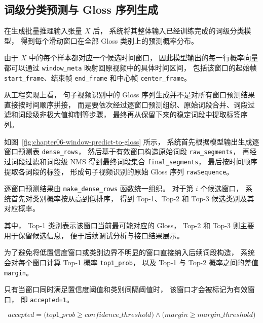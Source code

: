 
\subsection{词级分类预测与 Gloss 序列生成}

在生成批量推理输入张量 $X$ 后，
系统将其整体输入已经训练完成的词级分类模型，
得到每个滑动窗口在全部 Gloss 类别上的预测概率分布。

由于 $X$ 中的每个样本都对应一个候选时间窗口，
因此模型输出的每一行概率向量都可以通过 \texttt{window\_meta} 映射回原视频中的具体时间区间，
包括该窗口的起始帧 \texttt{start\_frame}、结束帧 \texttt{end\_frame} 和中心帧 \texttt{center\_frame}。

从工程实现上看，
句子视频识别中的 Gloss 序列生成并不是对所有窗口预测结果直接按时间顺序拼接，
而是要依次经过逐窗口预测组织、原始词段合并、词段过滤和词段级非极大值抑制等步骤，
最终再从保留下来的稳定词段中提取标签序列。


如图~\ref{fig:chapter06-window-predict-to-gloss} 所示，
系统首先根据模型输出生成逐窗口预测表 \texttt{dense\_rows}，
然后基于有效窗口构造原始词段 \texttt{raw\_segments}，
再经过词段过滤和词段级 NMS 得到最终词段集合 \texttt{final\_segments}，
最后按时间顺序提取各词段的标签，
形成句子视频识别的原始 Gloss 序列 \texttt{rawSequence}。

逐窗口预测结果由 \texttt{make\_dense\_rows} 函数统一组织。
对于第 $i$ 个候选窗口，
系统首先对类别概率按从高到低排序，
得到 Top-1、Top-2 和 Top-3 候选类别及其对应概率。

其中，
Top-1 类别表示该窗口当前最可能对应的 Gloss，
Top-2 和 Top-3 则主要用于保留候选信息，
便于后续调试分析与接口结果展示。

为了避免将低置信度窗口或类别边界不明显的窗口直接纳入后续词段构造，
系统会对每个窗口计算 Top-1 概率 \texttt{top1\_prob}，
以及 Top-1 与 Top-2 概率之间的差值 \texttt{margin}。

只有当窗口同时满足置信度阈值和类别间隔阈值时，
该窗口才会被标记为有效窗口，
即 \texttt{accepted=1}。

\begin{equation}
accepted=
\bigl(top1\_prob \geq confidence\_threshold\bigr)
\land
\bigl(margin \geq margin\_threshold\bigr)
\label{eq:chapter06-window-accepted}
\end{equation}

